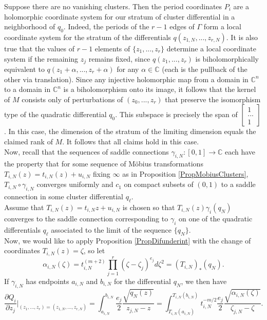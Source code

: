 \documentclass[12pt]{article}
\newcommand{\cc}{\mathbb{C}}
\begin{document}
\noindent Suppose there are no vanishing clusters. Then the period coordinates $P_i$ are a holomorphic coordinate system for our stratum of cluster differential in a neighborhood of $q_0$. Indeed, the periods of the $r-1$ edges of $\Gamma$ form a local coordinate system for the stratum of the differentials $q(z_{1,N},...,z_{r,N})$. It is also true that the values of $r-1$ elements of $\{z_1,...,z_r\}$ determine a local coordinate system if the remaining $z_j$ remains fixed, since $q(z_1,...,z_r)$ is biholomorphically equivalent to $q(z_1 + \alpha,...,z_r + \alpha)$ for any $\alpha \in \cc$ (each is the pullback of the other via translation). Since any injective holomorphic map from a domain in $\cc^n$ to a domain in $\cc^n$ is a biholomorphism onto its image, it follows that the kernel of $M$ consists only of perturbations of $(z_0,...,z_r)$ that preserve the isomorphism type of the quadratic differential $q_0$. This subspace is precisely the span of $\left[\begin{array}{c} 1 \\ ... \\ 1 \end{array}\right]$. In this case, the dimension of the stratum of the limiting dimension equals the claimed rank of $M$. It follows that all claims hold in this case.\\

\noindent Now, recall that the sequences of saddle connections $\gamma_{i,N}: [0,1] \to \cc$ each have the property that for some sequence of M\"obius transformations $T_{i,N}(z) = t_{i,N}(z) + u_{i,N}$ fixing $\infty$ as in Proposition \ref{PropMobiusClusters}, $T_{i,N} \circ \gamma_{i,N}$ converges uniformly and $c_1$ on compact subsets of $(0,1)$ to a saddle connection in some cluster differential $q_\ell$.\\

\noindent Assume that $T_{i,N}(z) = t_{i,N} z + u_{i,N}$ is chosen so that $T_{i,N}(z)\gamma_i(q_N)$ converges to the saddle connection corresponding to $\gamma_i$ on one of the quadratic differentials $q_\ell$ associated to the limit of the sequence $\{q_N\}$.\\

\noindent Now, we would like to apply Proposition \ref{PropDifunderint} with the change of coordinates $T_{i,N}(z) = \zeta$, so let $$\alpha_{i,N}(\zeta) = t_{i,N}^{(m+2)}\prod\limits_{j = 1}^r(\zeta - \zeta_j)^{e_j}d\zeta^2 = (T_{i,N})_*(q_N).$$ If $\gamma_{i,N}$ has endpoints $a_{i,N}$ and $b_{i,N}$ for the differential $q_N$, we then have $$\frac{\partial Q_i}{\partial z_j}|_{(z_1,...,z_r)=(z_{1,N},...,z_{r,N})} = \int_{a_{i,N}}^{b_{i,N}} \frac{e_j}{2} \frac{\sqrt{q_N(z)}}{z_{j,N} - z} = \int_{T_{i,N}(a_{i,N})}^{T_{i,N}(b_{i,N})} t_{i,N}^{-m/2}\frac{e_j}{2}\frac{\sqrt{\alpha_{i,N}(\zeta)}}{\zeta_{j,N} - \zeta}.$$
\end{document}
